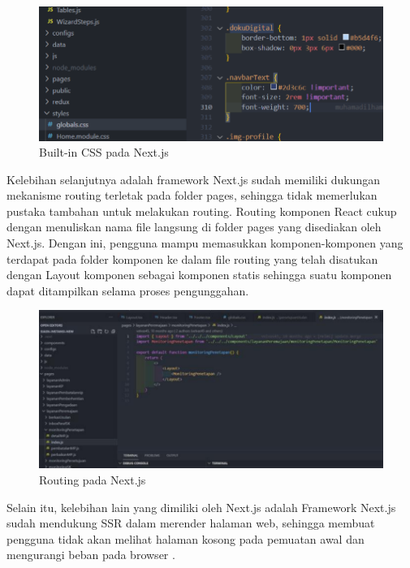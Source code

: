 \begin{figure} [H] \centering
  \includegraphics[scale=0.5]{gambar/bab2/builtincss.png}
  \caption{Built-in CSS pada Next.js \parencite{lazuardy2022}}
  \label{fig:builtincss}
\end{figure}

Kelebihan selanjutnya adalah framework Next.js sudah memiliki dukungan mekanisme routing terletak pada folder pages, sehingga tidak memerlukan pustaka tambahan untuk melakukan routing. Routing komponen React cukup dengan menuliskan nama file langsung di folder pages yang disediakan oleh Next.js. Dengan ini, pengguna mampu memasukkan komponen-komponen yang terdapat pada folder komponen ke dalam file routing yang telah disatukan dengan Layout komponen sebagai komponen statis sehingga suatu komponen dapat ditampilkan selama proses pengunggahan\parencite{lazuardy2022}.

\begin{figure} [H] \centering
  \includegraphics[scale=0.5]{gambar/bab2/routing.png}
  \caption{Routing pada Next.js\parencite{lazuardy2022}}
  \label{fig:routingnextjs}
\end{figure}

Selain itu, kelebihan lain yang dimiliki oleh Next.js adalah Framework Next.js sudah mendukung SSR dalam merender halaman web, sehingga membuat pengguna tidak akan melihat halaman kosong pada pemuatan awal dan mengurangi beban pada browser \parencite{lazuardy2022}.

